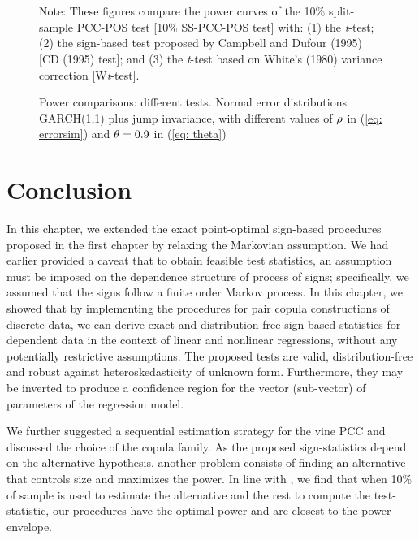 \documentclass[harvard,11pt]{article}
\begin{document}
\begin{figure}[tbph]
\caption{Power comparisons: different tests. Normal error distributions GARCH(1,1) plus jump invariance, with
different values of $\protect\rho $ in (\protect\ref{eq: errorsim}) and $\protect%
\theta =0.9$ in (\protect\ref{eq: theta})}
\begin{center}
 \\[0pt]
\\[0pt]
\end{center}
\doublespacing
Note: These figures compare the power curves of the 10\% split-sample PCC-POS test
[10\% SS-PCC-POS test] with: (1) the \textit{t}-test; (2) the sign-based test
proposed by Campbell and Dufour (1995) [CD (1995) test]; and (3) the \textit{t}-test based
on White's (1980) variance correction [W\textit{t}-test]. 
\label{fig: Sim612}
\end{figure}
\FloatBarrier
\section{Conclusion \label{ConclusionC3}}
In this chapter, we extended the exact point-optimal sign-based procedures proposed in the first chapter by relaxing the Markovian assumption. We had earlier provided a caveat that to obtain feasible test statistics, an assumption must be imposed on the dependence structure of process of signs; specifically, we assumed that the signs follow a finite order Markov process. In this chapter, we showed that by implementing the procedures for pair copula constructions of discrete data, we can derive exact and distribution-free sign-based statistics for dependent data in the context of linear and nonlinear regressions, without any potentially restrictive assumptions. The proposed tests are valid, distribution-free and robust against heteroskedasticity of unknown form. Furthermore, they may be inverted to produce a confidence region for the vector (sub-vector) of parameters of the regression model. 

We further suggested a sequential estimation strategy for the vine PCC and discussed the choice of the copula family. As the proposed sign-statistics depend on the alternative hypothesis, another problem consists of finding an alternative that controls size and maximizes the power. In line with \citet{dufour2010exact}, we find that when 10\% of sample is used to estimate the alternative and the rest to compute the test-statistic, our procedures have the optimal power and are closest to the power envelope.
\end{document}
